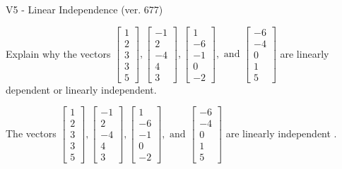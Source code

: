 \begin{exercise}
  \begin{exerciseTitle}V5 - Linear Independence (ver. 677)\end{exerciseTitle}
  \begin{exerciseStatement}
    Explain why the vectors \(\left[\begin{array}{r}
1 \\
2 \\
3 \\
3 \\
5
\end{array}\right] , \left[\begin{array}{r}
-1 \\
2 \\
-4 \\
4 \\
3
\end{array}\right] , \left[\begin{array}{r}
1 \\
-6 \\
-1 \\
0 \\
-2
\end{array}\right] , \text{ and } \left[\begin{array}{r}
-6 \\
-4 \\
0 \\
1 \\
5
\end{array}\right]\) are linearly dependent or linearly independent.	


  \end{exerciseStatement}
  \begin{exerciseAnswer}
   The vectors \(\left[\begin{array}{r}
1 \\
2 \\
3 \\
3 \\
5
\end{array}\right] , \left[\begin{array}{r}
-1 \\
2 \\
-4 \\
4 \\
3
\end{array}\right] , \left[\begin{array}{r}
1 \\
-6 \\
-1 \\
0 \\
-2
\end{array}\right] , \text{ and } \left[\begin{array}{r}
-6 \\
-4 \\
0 \\
1 \\
5
\end{array}\right]\) are 
  	 linearly independent  .
  


  \end{exerciseAnswer}
\end{exercise}